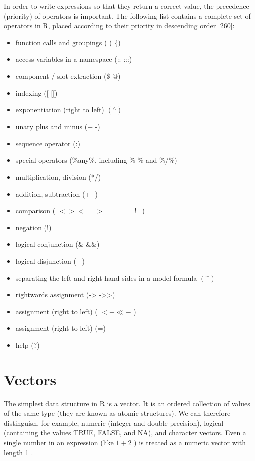 \documentclass[11pt,openany,executivepaper]{book}
\begin{document}
In order to write expressions so that they return a correct value, the precedence (priority) of operators is important. The following list contains a complete set of operators in R, placed according to their priority in descending order [260]:

\begin{itemize}
  \item function calls and groupings ( ( \{)
  \item access variables in a namespace (:: :::)
  \item component / slot extraction (\$ @)
  \item indexing ([ [[)
  \item exponentiation (right to left) $\left({ }^{\wedge}\right)$
  \item unary plus and minus (+ -)
  \item sequence operator (:)
  \item special operators (\%any\%, including \% \% and \%/\%)
  \item multiplication, division (*/)
  \item addition, subtraction (+ -)
  \item comparison ( $<><=>===$ !=)
  \item negation (!)
  \item logical conjunction (\& \&\&)
  \item logical disjunction (|||)
  \item separating the left and right-hand sides in a model formula $\left({ }^{\sim}\right)$
  \item rightwards assignment (-> ->>)
  \item assignment (right to left) ( $<-\ll-$ )
  \item assignment (right to left) (=)
  \item help (?)
\end{itemize}

\section{Vectors}
The simplest data structure in R is a vector. It is an ordered collection of values of the same type (they are known as atomic structures). We can therefore distinguish, for example, numeric (integer and double-precision), logical (containing the values TRUE, FALSE, and NA), and character vectors. Even a single number in an expression (like $1+2$ ) is treated as a numeric vector with length 1 .
\end{document}
